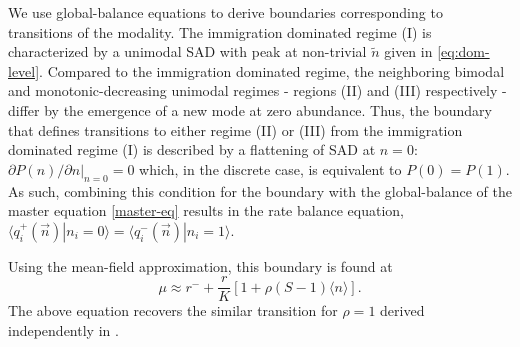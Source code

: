 \documentclass[9pt,twocolumn,twoside,lineno]{pnas-new}
\begin{document}
We use global-balance equations to derive boundaries corresponding to transitions of the modality.
The immigration dominated regime (I) is characterized by a unimodal SAD with peak at non-trivial $\tilde{n}$ given in \eqref{eq:dom-level}.
Compared to the immigration dominated regime, the neighboring bimodal and monotonic-decreasing unimodal regimes - regions (II) and (III) respectively - differ by the emergence of a new mode at zero abundance. 
Thus, the boundary that defines transitions to either regime (II) or (III) from the immigration dominated regime (I) is described by a flattening of SAD at $n=0$: $\partial P(n)/ \partial n|_{n=0} = 0$ which, in the discrete case, is equivalent to $P(0)=P(1)$.
As such, combining this condition for the boundary with the global-balance of the master equation \eqref{master-eq} results in the rate balance equation,
$\langle q_i^+(\vec{n})|n_i=0 \rangle=\langle q_i^-(\vec{n})|n_i=1 \rangle$.

Using the mean-field approximation, this boundary is found at
\begin{equation}
    \label{eq:boundary-I}
    \mu \approx r^- +\frac{r}{K}[1+\rho(S-1)\langle n \rangle ].
\end{equation}
The above equation recovers the similar transition for $\rho=1$ derived independently in \cite{xu2018immigration}. 
\end{document}
